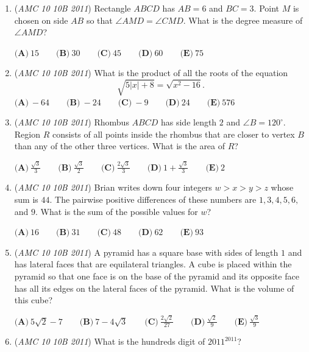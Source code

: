 \begin{enumerate}
$\textbf{(A)}\ 120 \qquad\textbf{(B)}\ 125 \qquad\textbf{(C)}\ 130 \qquad\textbf{(D)}\ 135 \qquad\textbf{(E)}\ 140$


	\item (\textit{AMC 10 10B 2011}) Rectangle $ABCD$ has $AB = 6$ and $BC = 3$. Point $M$ is chosen on side $AB$ so that $\angle AMD = \angle CMD$. What is the degree measure of $\angle AMD$?


 $\textbf{(A)}\ 15 \qquad\textbf{(B)}\ 30 \qquad\textbf{(C)}\ 45 \qquad\textbf{(D)}\ 60 \qquad\textbf{(E)}\ 75$


	\item (\textit{AMC 10 10B 2011}) What is the product of all the roots of the equation 
 \[\sqrt{5 | x | + 8} = \sqrt{x^2 - 16}.\]
$\textbf{(A)}\ -64 \qquad\textbf{(B)}\ -24 \qquad\textbf{(C)}\ -9 \qquad\textbf{(D)}\ 24 \qquad\textbf{(E)}\ 576$


	\item (\textit{AMC 10 10B 2011}) Rhombus $ABCD$ has side length $2$ and $\angle B = 120^\circ$. Region $R$ consists of all points inside the rhombus that are closer to vertex $B$ than any of the other three vertices. What is the area of $R$?


 $\textbf{(A)}\ \frac{\sqrt{3}}{3} \qquad\textbf{(B)}\ \frac{\sqrt{3}}{2} \qquad\textbf{(C)}\ \frac{2\sqrt{3}}{3} \qquad\textbf{(D)}\ 1 + \frac{\sqrt{3}}{3} \qquad\textbf{(E)}\ 2$


	\item (\textit{AMC 10 10B 2011}) Brian writes down four integers $w > x > y > z$ whose sum is $44$. The pairwise positive differences of these numbers are $1, 3, 4, 5, 6,$ and $9$. What is the sum of the possible values for $w$?


 $\textbf{(A)}\ 16 \qquad\textbf{(B)}\ 31 \qquad\textbf{(C)}\ 48 \qquad\textbf{(D)}\ 62 \qquad\textbf{(E)}\ 93$


	\item (\textit{AMC 10 10B 2011}) A pyramid has a square base with sides of length $1$ and has lateral faces that are equilateral triangles. A cube is placed within the pyramid so that one face is on the base of the pyramid and its opposite face has all its edges on the lateral faces of the pyramid. What is the volume of this cube?


 $\textbf{(A)}\ 5\sqrt{2} - 7 \qquad\textbf{(B)}\ 7 - 4\sqrt{3} \qquad\textbf{(C)}\ \frac{2\sqrt{2}}{27} \qquad\textbf{(D)}\ \frac{\sqrt{2}}{9} \qquad\textbf{(E)}\ \frac{\sqrt{3}}{9}$


	\item (\textit{AMC 10 10B 2011}) What is the hundreds digit of $2011^{2011}$?



\end{enumerate}
